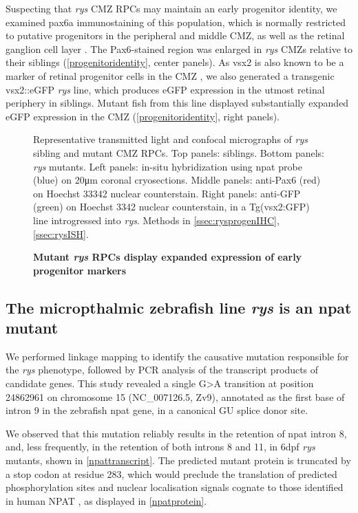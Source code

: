 Suspecting that \textit{rys} CMZ RPCs may maintain an early progenitor identity, we examined pax6a immunostaining of this population, which is normally restricted to putative progenitors in the peripheral and middle CMZ, as well as the retinal ganglion cell layer \cite{Raymond2006}. The Pax6-stained region was enlarged in \textit{rys} CMZs relative to their siblings (\autoref{progenitoridentity}, center panels). As vsx2 is also known to be a marker of retinal progenitor cells in the CMZ \cite{Raymond2006}, we also generated a transgenic vsx2::eGFP \textit{rys} line, which produces eGFP expression in the utmost retinal periphery in siblings. Mutant fish from this line displayed substantially expanded eGFP expression in the CMZ (\autoref{progenitoridentity}, right panels).

\begin{figure}[!h]
    \caption{{\bf Mutant \textit{rys} RPCs display expanded expression of early progenitor markers}}
    Representative transmitted light and confocal micrographs of \textit{rys} sibling and mutant CMZ RPCs. Top panels: siblings. Bottom panels: \textit{rys} mutants. Left panels: in-situ hybridization using npat probe (blue) on 20\si{\micro\metre} coronal cryosections. Middle panels: anti-Pax6 (red) on Hoechst 33342 nuclear counterstain. Right panels: anti-GFP (green) on Hoechst 3342 nuclear counterstain, in a Tg(vsx2:GFP) line introgressed into \textit{rys}. 
    Methods in \autoref{ssec:rysprogenIHC}, \autoref{ssec:rysISH}.
    \label{progenitoridentity}
\end{figure}

\FloatBarrier
\subsection{The micropthalmic zebrafish line \textit{rys} is an npat mutant}

We performed linkage mapping to identify the causative mutation responsible for the \textit{rys} phenotype, followed by PCR analysis of the transcript products of candidate genes. This study revealed a single G\textgreater{}A transition at position 24862961 on chromosome 15 (NC\_007126.5, Zv9), annotated as the first base of intron 9 in the zebrafish npat gene, in a canonical GU splice donor site. 

We observed that this mutation reliably results in the retention of npat intron 8, and, less frequently, in the retention of both introns 8 and 11, in 6dpf \textit{rys} mutants, shown in \autoref{npattranscript}. The predicted mutant protein is truncated by a stop codon at residue 283, which would preclude the translation of predicted phosphorylation sites and nuclear localisation signals cognate to those identified in human NPAT \cite{Ma2000,Sagara2002}, as displayed in \autoref{npatprotein}.

